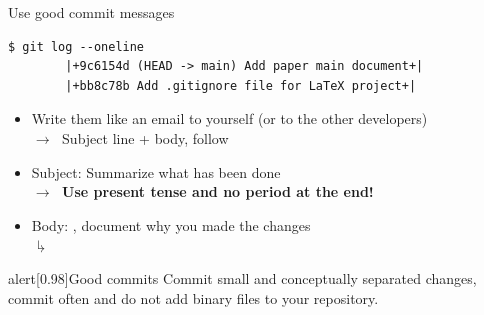 \documentclass[usenames,svgnames,14pt]{beamer}
\begin{document}
\begin{frame}[fragile]{Use good commit messages}
    \begin{lstlisting}[style=MyBash]
        $ git log --oneline
        |+9c6154d (HEAD -> main) Add paper main document+|
        |+bb8c78b Add .gitignore file for LaTeX project+|
    \end{lstlisting}
    \vspace{1mm}
    \begin{itemize}
        \item Write them like an email to yourself (or to the other developers)\\
              $\to\;$ Subject line + body, follow 
        \item Subject: Summarize what has been done\\
              $\to\;$ \alert{\textbf{Use present tense and no period at the end!}}
        \item Body: , document why you made the changes\\[-0.5ex]
              \phantom{Bo}$\drsh$
    \end{itemize}
    \begin{varblock}{alert}[0.98\textwidth]{Good commits}
        Commit small and conceptually separated changes, commit often and do not add binary files to your repository.
    \end{varblock}
\end{frame}
\end{document}
